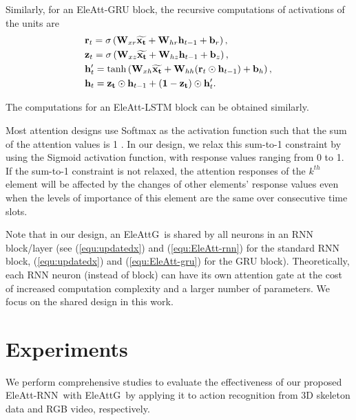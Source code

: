 \documentclass[runningheads]{llncs}
\newcommand{\EleAttG}{{EleAttG~}}
\newcommand{\EARNN}{EleAtt-RNN}
\begin{document}
{	Similarly, for an EleAtt-GRU block, the recursive computations of activations of the units are
	\begin{equation}
	\label{equ:EleAtt-gru}
	\begin{aligned}
	\!&\mathbf{r}_t = \sigma \left( {\mathbf{W}}_{xr} \widetilde{\bf{x}_t} + {\mathbf{W}}_{hr} \mathbf{h}_{t-1} + \mathbf{b}_r \right),\\
	\!&\mathbf{z}_t = \sigma \left( {\mathbf{W}}_{xz} \widetilde{\bf{x}_t} + {\mathbf{W}}_{hz} \mathbf{h}_{t-1} + \mathbf{b}_z \right),\\
	\!&\mathbf{h}_t' = \tanh \left( {\mathbf{W}}_{xh} \widetilde{\bf{x}_t} + {\mathbf{W}}_{hh} (\mathbf{r}_t \odot \mathbf{h}_{t-1}) + \mathbf{b}_h \right),\\
	\!&\mathbf{h}_t =  {\mathbf{z_t}} \odot {\mathbf{h}_{t-1}}  + ({\mathbf{1 - z_t}}) \odot {\mathbf{h}_t'}.\\
	\end{aligned}
	\end{equation}
	
	The computations for an EleAtt-LSTM block can be obtained similarly.


	Most attention designs use Softmax as the activation function such that the sum of the attention values is 1 \cite{luong2015effective,vaswani2017attention,xu2015show,li2017attentive,sharma2015actionattention,wang2016hierarchical,song2017end}. In our design, we relax this sum-to-1 constraint by using the Sigmoid activation function, with response values ranging from 0 to 1. If the sum-to-1 constraint is not relaxed, the attention responses of the $k^{th}$ element will be affected by the changes of other elements' response values even when the levels of importance of this element are the same over consecutive time slots. 


	
	Note that in our design, an \EleAttG is shared by all neurons in an RNN block/layer (see (\ref{equ:updatedx}) and (\ref{equ:EleAtt-rnn}) for the standard RNN block, (\ref{equ:updatedx}) and (\ref{equ:EleAtt-gru}) for the GRU block). Theoretically, each RNN neuron (instead of block) can have its own attention gate at the cost of increased computation complexity and a larger number of parameters. We focus on the shared design in this work.}

\section{Experiments}
We perform comprehensive studies to evaluate the effectiveness of our proposed \EARNN~with \EleAttG by applying it to action recognition from 3D skeleton data and RGB video, respectively. 
\end{document}
